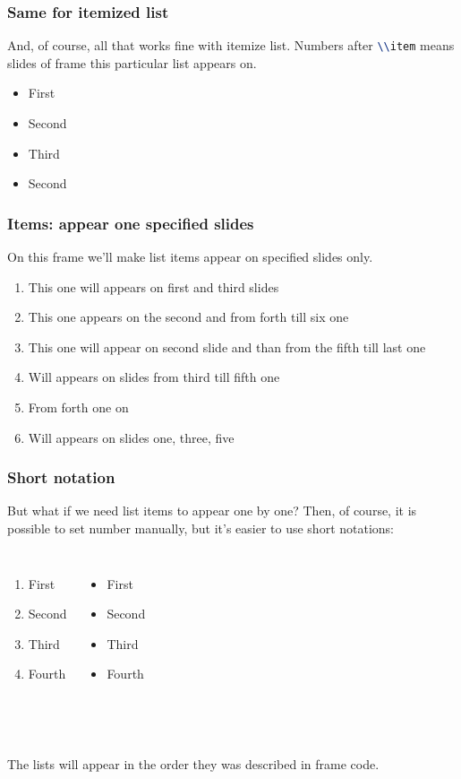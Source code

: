 \begin{frame}
    \frametitle{Same for itemized list}
    And, of course, all that works fine with itemize list. Numbers after \lstinline[language=tex]{\\item} means slides of frame this particular list appears on.
    \begin{itemize}
	\item<1-> First
	\item<2-> Second
	\item<3-> Third
	\item<2-> Second
    \end{itemize}
\end{frame}

\begin{frame}
    \frametitle{Items: appear one specified slides}
    On this frame we'll make list items appear on specified slides only. 
    \begin{enumerate}
	\item<1,3> This one will appears on first and third slides
	\item<2,4-6> This one appears on the second and from forth till six one
	\item<2,5-> This one will appear on second slide and than from the fifth till last one
	\item<3-5> Will appears on slides from third till fifth one
	\item<4-> From forth one on
	\item<1,3,5> Will appears on slides one, three, five
    \end{enumerate}
\end{frame}

\begin{frame}
    \frametitle{Short notation}
    But what if we need list items to appear one by one? Then, of course, it is possible to set number manually, but it's easier to use short notations:
    \begin{columns}
	\begin{enumerate}
	    \item<+-> First
	    \item<+-> Second
	    \item<+-> Third
	    \item<+-> Fourth
        \end{enumerate}
        \begin{itemize}[<+->]
	    \item First
	    \item Second
	    \item Third
	    \item Fourth
        \end{itemize}
    \end{columns}

    ~\\~\\The lists will appear in the order they was described in frame code.
\end{frame}

